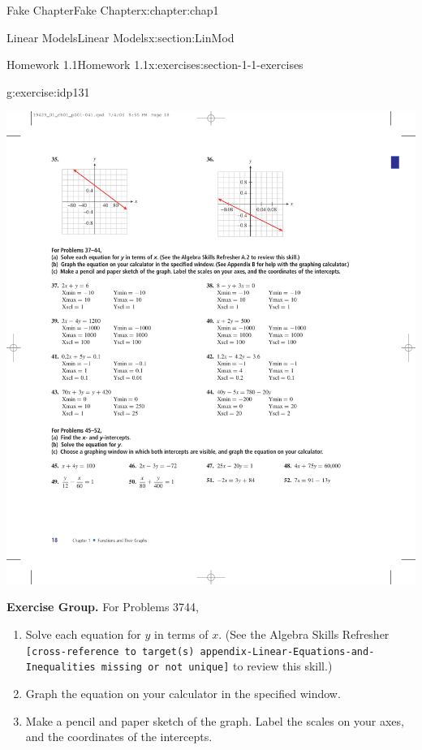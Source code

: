 \documentclass[oneside,10pt,]{book}
\newcommand{\mono}[1]{\texttt{#1}}
\numberwithin{equation}{section}
\begin{document}
\begin{chapterptx}{Fake Chapter}{}{Fake Chapter}{}{}{x:chapter:chap1}
\begin{sectionptx}{Linear Models}{}{Linear Models}{}{}{x:section:LinMod}
\begin{exercises-subsection}{Homework 1.1}{}{Homework 1.1}{}{}{x:exercises:section-1-1-exercises}
\begin{exercisegroupcol}{2}
\begin{divisionexerciseegcol}{36}{}{}{g:exercise:idp131}
\begin{sidebyside}{1}{0.1}{0.1}{0}
\begin{sbspanel}{0.8}
\includegraphics[width=\linewidth]{external/photos/fig-ex-1-1-36.pdf}
\end{sbspanel}%
\end{sidebyside}%
\end{divisionexerciseegcol}%
\end{exercisegroupcol}
\par\medskip\noindent
\par\medskip\noindent%
\textbf{Exercise Group.}\space\space%
For Problems 37\textendash{}44,%
\begin{enumerate}[label=\alph*]
\item{}Solve each equation for \(y\) in terms of \(x\). (See the Algebra Skills Refresher \mono{[cross-reference to target(s) \textquotedbl{}appendix-Linear-Equations-and-Inequalities\textquotedbl{} missing or not unique]} to review this skill.)%
\item{}Graph the equation on your calculator in the specified window.%
\item{}Make a pencil and paper sketch of the graph. Label the scales on your axes, and the coordinates of the intercepts.%
\end{enumerate}
%
\begin{exercisegroupcol}{2}

\end{exercisegroupcol}
\end{exercises-subsection}
\end{sectionptx}
\end{chapterptx}
\end{document}
